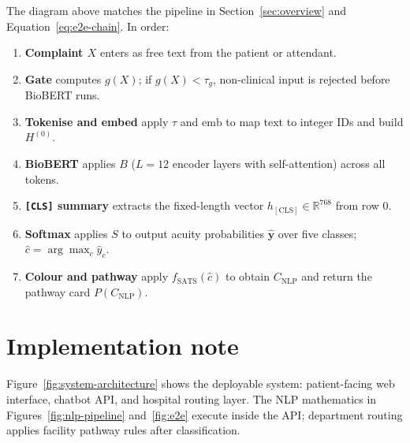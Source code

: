 The diagram above matches the pipeline in Section~\ref{sec:overview} and Equation~\eqref{eq:e2e-chain}. In order:
\begin{enumerate}
\item \textbf{Complaint \(X\)} enters as free text from the patient or attendant.
\item \textbf{Gate} computes \(g(X)\); if \(g(X)<\tau_g\), non-clinical input is rejected before BioBERT runs.
\item \textbf{Tokenise and embed} apply \(\tau\) and \(\mathrm{emb}\) to map text to integer IDs and build \(H^{(0)}\).
\item \textbf{BioBERT} applies \(B\) (\(L=12\) encoder layers with self-attention) across all tokens.
\item \textbf{\texttt{[CLS]} summary} extracts the fixed-length vector \(h_{\mathrm{[CLS]}}\in\mathbb{R}^{768}\) from row 0.
\item \textbf{Softmax} applies \(S\) to output acuity probabilities \(\hat{\mathbf{y}}\) over five classes; \(\hat{c}=\arg\max_c\hat{y}_c\).
\item \textbf{Colour and pathway} apply \(f_{\mathrm{SATS}}(\hat{c})\) to obtain \(C_{\mathrm{NLP}}\) and return the pathway card \(P(C_{\mathrm{NLP}})\).
\end{enumerate}

\section{Implementation note}
\label{sec:implementation}

Figure~\ref{fig:system-architecture} shows the deployable system: patient-facing web interface, chatbot API, and hospital routing layer. The NLP mathematics in Figures~\ref{fig:nlp-pipeline} and~\ref{fig:e2e} execute inside the API; department routing applies facility pathway rules after classification.


